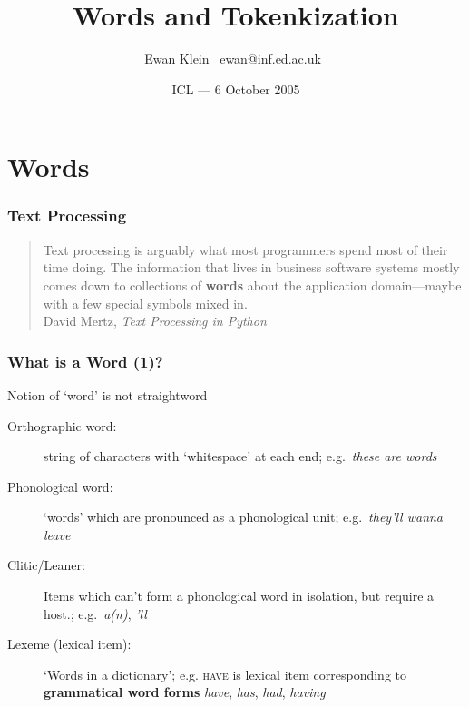 \title{Words and Tokenkization }
\author{Ewan Klein \newline \mbox{ }ewan@inf.ed.ac.uk\mbox{ }}
\date{ICL --- 6 October 2005}



\frame{\titlepage}




\frame{\tableofcontents}

\section{Words}

\begin{frame}[fragile]
  \frametitle{Text Processing}



  \begin{quotation}
    \noindent
    Text processing is arguably what most programmers spend most of
    their time doing. The information that lives in business software
    systems mostly comes down to collections of \textbf{words} about the
    application domain---maybe with a few special symbols mixed in.\\
    \noindent
    David Mertz, \textit{Text Processing in Python}
  \end{quotation}
\end{frame}

\begin{frame}[fragile]
  \frametitle{What is a Word (1)?}



Notion of `word' is not straightword

    \begin{description}
    \item[Orthographic word:] string of characters with `whitespace'
      at each end; e.g.\ \textit{these are words}

    \item[Phonological word:] `words' which are pronounced as a
      phonological unit; e.g.\ \textit{they'll wanna leave}

    \item[Clitic/Leaner:] Items which can't form a phonological word
      in isolation, but require a host.; e.g.\ \textit{a(n)},
      \textit{'ll}

    \item[Lexeme (lexical item):] `Words in a dictionary';
        e.g. \textsc{have} is lexical item corresponding to
        \textbf{grammatical word forms}
        \textit{have}, \textit{has}, \textit{had}, \textit{having}
    \end{description}

\end{frame}


